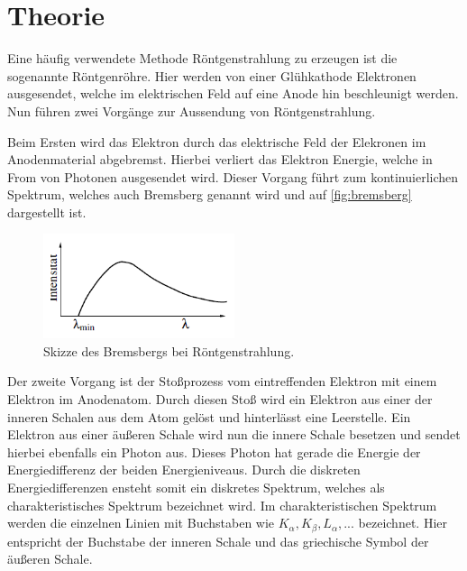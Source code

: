 \section{Theorie}
\label{sec:Theorie}




Eine häufig verwendete Methode Röntgenstrahlung zu erzeugen ist die sogenannte Röntgenröhre.
Hier werden von einer Glühkathode Elektronen ausgesendet, welche im elektrischen Feld auf eine Anode hin beschleunigt werden.
Nun führen zwei Vorgänge zur Aussendung von Röntgenstrahlung.

Beim Ersten wird das Elektron durch das elektrische Feld der Elekronen im Anodenmaterial abgebremst.
Hierbei verliert das Elektron Energie, welche in From von Photonen ausgesendet wird.
Dieser Vorgang führt zum kontinuierlichen Spektrum, welches auch Bremsberg genannt wird und auf \autoref{fig:bremsberg} dargestellt ist.

\begin{figure}
    \centering
    \includegraphics[width=0.5\textwidth]{images/bremsberg.png}
    \caption{Skizze des Bremsbergs bei Röntgenstrahlung.\cite{V602}}
    \label{fig:bremsberg}
\end{figure}

Der zweite Vorgang ist der Stoßprozess vom eintreffenden Elektron mit einem Elektron im Anodenatom.
Durch diesen Stoß wird ein Elektron aus einer der inneren Schalen aus dem Atom gelöst und hinterlässt eine Leerstelle.
Ein Elektron aus einer äußeren Schale wird nun die innere Schale besetzen und sendet hierbei ebenfalls ein Photon aus.
Dieses Photon hat gerade die Energie der Energiedifferenz der beiden Energieniveaus.
Durch die diskreten Energiedifferenzen ensteht somit ein diskretes Spektrum, welches als charakteristisches Spektrum bezeichnet wird.
Im charakteristischen Spektrum werden die einzelnen Linien mit Buchstaben wie $K_\alpha,K_\beta,L_\alpha,...$ bezeichnet.
Hier entspricht der Buchstabe der inneren Schale und das griechische Symbol der äußeren Schale.

